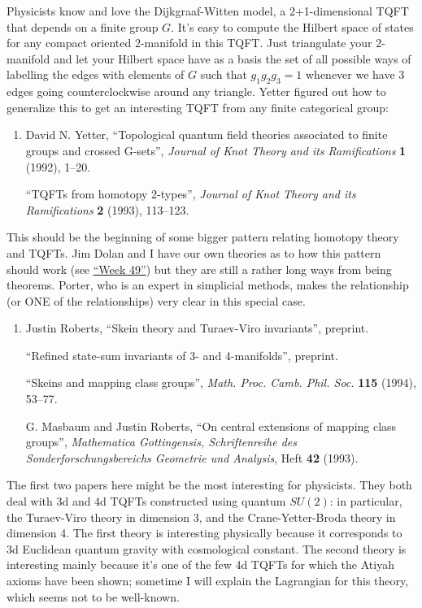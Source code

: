 \documentclass{article}
\begin{document}
Physicists know and love the Dijkgraaf-Witten model, a 2+1-dimensional
TQFT that depends on a finite group \(G\). It's easy to compute the
Hilbert space of states for any compact oriented 2-manifold in this
TQFT. Just triangulate your 2-manifold and let your Hilbert space have
as a basis the set of all possible ways of labelling the edges with
elements of \(G\) such that \(g_1g_2g_3 = 1\) whenever we have 3 edges
going counterclockwise around any triangle. Yetter figured out how to
generalize this to get an interesting TQFT from any finite categorical
group:

\begin{enumerate}
\def\labelenumi{\arabic{enumi})}
\setcounter{enumi}{3}
\item
  David N. Yetter, ``Topological quantum field theories associated to
  finite groups and crossed G-sets'', \emph{Journal of Knot Theory and
  its Ramifications} \textbf{1} (1992), 1--20.

  ``TQFTs from homotopy 2-types'', \emph{Journal of Knot Theory and its
  Ramifications} \textbf{2} (1993), 113--123.
\end{enumerate}

This should be the beginning of some bigger pattern relating homotopy
theory and TQFTs. Jim Dolan and I have our own theories as to how this
pattern should work (see \protect\hyperlink{week49}{``Week 49''}) but
they are still a rather long ways from being theorems. Porter, who is an
expert in simplicial methods, makes the relationship (or ONE of the
relationships) very clear in this special case.

\begin{enumerate}
\def\labelenumi{\arabic{enumi})}
\setcounter{enumi}{4}
\item
  Justin Roberts, ``Skein theory and Turaev-Viro invariants'', preprint.

  ``Refined state-sum invariants of 3- and 4-manifolds'', preprint.

  ``Skeins and mapping class groups'', \emph{Math. Proc. Camb. Phil.
  Soc.} \textbf{115} (1994), 53--77.

  G. Masbaum and Justin Roberts, ``On central extensions of mapping
  class groups'', \emph{Mathematica Gottingensis, Schriftenreihe des
  Sonderforschungsbereichs Geometrie und Analysis}, Heft \textbf{42}
  (1993).
\end{enumerate}

The first two papers here might be the most interesting for physicists.
They both deal with 3d and 4d TQFTs constructed using quantum \(SU(2)\):
in particular, the Turaev-Viro theory in dimension 3, and the
Crane-Yetter-Broda theory in dimension 4. The first theory is
interesting physically because it corresponds to 3d Euclidean quantum
gravity with cosmological constant. The second theory is interesting
mainly because it's one of the few 4d TQFTs for which the Atiyah axioms
have been shown; sometime I will explain the Lagrangian for this theory,
which seems not to be well-known.
\end{document}
